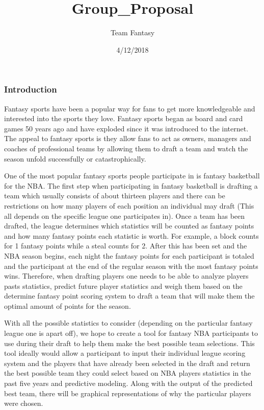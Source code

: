 \documentclass[]{article}
\title{Group\_Proposal}
\author{Team Fantasy}
\date{4/12/2018}
\begin{document}
\maketitle

\subsubsection{Introduction}\label{introduction}

Fantasy sports have been a popular way for fans to get more
knowledgeable and interested into the sports they love. Fantasy sports
began as board and card games 50 years ago and have exploded since it
was introduced to the internet. The appeal to fantasy sports is they
allow fans to act as owners, managers and coaches of professional teams
by allowing them to draft a team and watch the season unfold
successfully or catastrophically.

One of the most popular fantasy sports people participate in is fantasy
basketball for the NBA. The first step when participating in fantasy
basketball is drafting a team which usually consists of about thirteen
players and there can be restrictions on how many players of each
position an individual may draft (This all depends on the specific
league one participates in). Once a team has been drafted, the league
determines which statistics will be counted as fantasy points and how
many fantasy points each statistic is worth. For example, a block counts
for 1 fantasy points while a steal counts for 2. After this has been set
and the NBA season begins, each night the fantasy points for each
participant is totaled and the participant at the end of the regular
season with the most fantasy points wins. Therefore, when drafting
players one needs to be able to analyze players pasts statistics,
predict future player statistics and weigh them based on the determine
fantasy point scoring system to draft a team that will make them the
optimal amount of points for the season.

With all the possible statistics to consider (depending on the
particular fantasy league one is apart off), we hope to create a tool
for fantasy NBA participants to use during their draft to help them make
the best possible team selections. This tool ideally would allow a
participant to input their individual league scoring system and the
players that have already been selected in the draft and return the best
possible team they could select based on NBA players statistics in the
past five years and predictive modeling. Along with the output of the
predicted best team, there will be graphical representations of why the
particular players were chosen.
\end{document}
